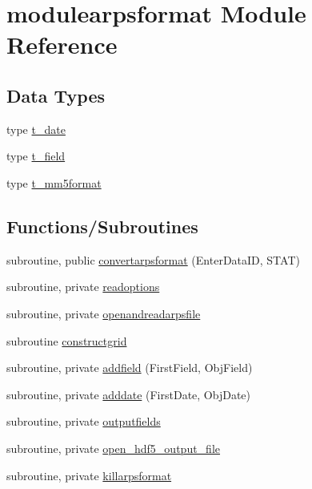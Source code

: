 \hypertarget{namespacemodulearpsformat}{}\section{modulearpsformat Module Reference}
\label{namespacemodulearpsformat}
\subsection*{Data Types}
\begin{DoxyCompactItemize}
\item 
type \mbox{\hyperlink{structmodulearpsformat_1_1t__date}{t\+\_\+date}}
\item 
type \mbox{\hyperlink{structmodulearpsformat_1_1t__field}{t\+\_\+field}}
\item 
type \mbox{\hyperlink{structmodulearpsformat_1_1t__mm5format}{t\+\_\+mm5format}}
\end{DoxyCompactItemize}
\subsection*{Functions/\+Subroutines}
\begin{DoxyCompactItemize}
\item 
subroutine, public \mbox{\hyperlink{namespacemodulearpsformat_a996acecfde01fb49e6408da52cb50d12}{convertarpsformat}} (Enter\+Data\+ID, S\+T\+AT)
\item 
subroutine, private \mbox{\hyperlink{namespacemodulearpsformat_a51cf1784c51ab9940cffc068600d53ac}{readoptions}}
\item 
subroutine, private \mbox{\hyperlink{namespacemodulearpsformat_a70ee83442772ea85df79da65ec4ea262}{openandreadarpsfile}}
\item 
subroutine \mbox{\hyperlink{namespacemodulearpsformat_a420eb740016c6ba55f897dbff1ef74e5}{constructgrid}}
\item 
subroutine, private \mbox{\hyperlink{namespacemodulearpsformat_a32649b9f39dfaa2b5396d488243a3905}{addfield}} (First\+Field, Obj\+Field)
\item 
subroutine, private \mbox{\hyperlink{namespacemodulearpsformat_a3e7adeca2b8b386d9c8d59f32a8c189f}{adddate}} (First\+Date, Obj\+Date)
\item 
subroutine, private \mbox{\hyperlink{namespacemodulearpsformat_a3feae8181a739c2898e331dd969e3c67}{outputfields}}
\item 
subroutine, private \mbox{\hyperlink{namespacemodulearpsformat_a9c9927c6fb171da5b0bfc4cd38595627}{open\+\_\+hdf5\+\_\+output\+\_\+file}}
\item 
subroutine, private \mbox{\hyperlink{namespacemodulearpsformat_a3fbe9c856c732d4e5f2315c2ae61e3d3}{killarpsformat}}
\end{DoxyCompactItemize}
